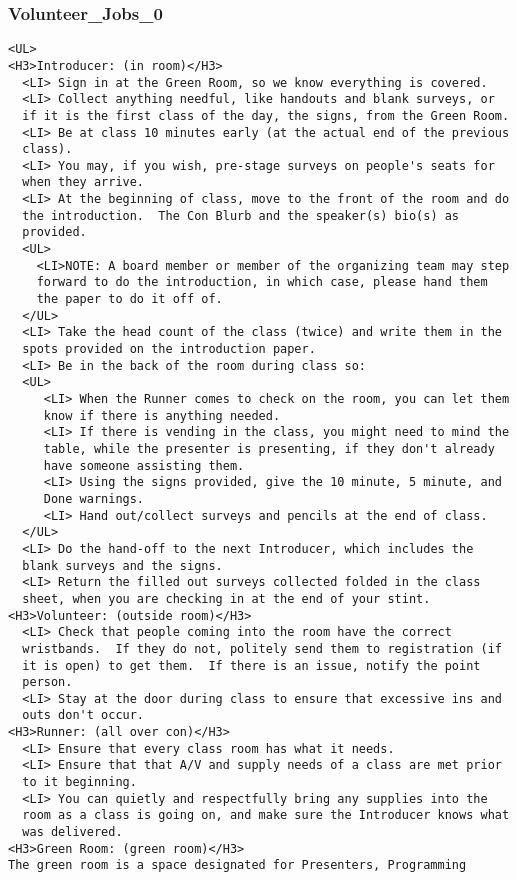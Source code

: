 \documentclass[captions=tablesignature]{scrartcl}
\begin{document}
\subsubsection{Volunteer\_Jobs\_0}
\label{sec-3-5-5}
\begin{verbatim}
<UL>
<H3>Introducer: (in room)</H3>
  <LI> Sign in at the Green Room, so we know everything is covered.
  <LI> Collect anything needful, like handouts and blank surveys, or
  if it is the first class of the day, the signs, from the Green Room.
  <LI> Be at class 10 minutes early (at the actual end of the previous
  class).
  <LI> You may, if you wish, pre-stage surveys on people's seats for
  when they arrive.
  <LI> At the beginning of class, move to the front of the room and do
  the introduction.  The Con Blurb and the speaker(s) bio(s) as
  provided.
  <UL>
    <LI>NOTE: A board member or member of the organizing team may step
    forward to do the introduction, in which case, please hand them
    the paper to do it off of.
  </UL>
  <LI> Take the head count of the class (twice) and write them in the
  spots provided on the introduction paper.
  <LI> Be in the back of the room during class so:
  <UL>
     <LI> When the Runner comes to check on the room, you can let them
     know if there is anything needed.
     <LI> If there is vending in the class, you might need to mind the
     table, while the presenter is presenting, if they don't already
     have someone assisting them.
     <LI> Using the signs provided, give the 10 minute, 5 minute, and
     Done warnings.
     <LI> Hand out/collect surveys and pencils at the end of class.
  </UL>
  <LI> Do the hand-off to the next Introducer, which includes the
  blank surveys and the signs.
  <LI> Return the filled out surveys collected folded in the class
  sheet, when you are checking in at the end of your stint.
<H3>Volunteer: (outside room)</H3>
  <LI> Check that people coming into the room have the correct
  wristbands.  If they do not, politely send them to registration (if
  it is open) to get them.  If there is an issue, notify the point
  person.
  <LI> Stay at the door during class to ensure that excessive ins and
  outs don't occur.
<H3>Runner: (all over con)</H3>
  <LI> Ensure that every class room has what it needs.
  <LI> Ensure that that A/V and supply needs of a class are met prior
  to it beginning.
  <LI> You can quietly and respectfully bring any supplies into the
  room as a class is going on, and make sure the Introducer knows what
  was delivered.
<H3>Green Room: (green room)</H3>
The green room is a space designated for Presenters, Programming

\end{verbatim}
\end{document}
